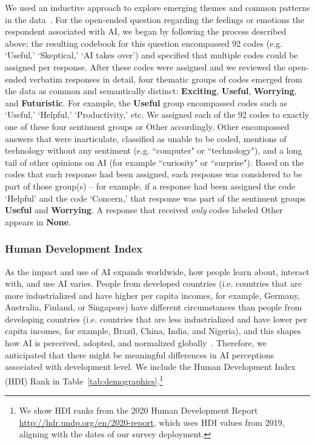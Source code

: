 \documentclass[11pt]{article} %
\def\Exciting/{{\fontfamily{lmss}\selectfont\textbf{Exciting}}}  \def\Useful/{{\fontfamily{lmss}\selectfont\textbf{Useful}}}
\def\Worrying/{{\fontfamily{lmss}\selectfont\textbf{Worrying}}}
\def\Futuristic/{{\fontfamily{lmss}\selectfont\textbf{Futuristic}}}
\def\None/{{\fontfamily{lmss}\selectfont\textbf{None}}}
\begin{document}
We used an inductive approach to explore emerging themes and common patterns in the data~\cite{hinkin1998brief}. For the open-ended question regarding the feelings or emotions the respondent associated with AI, we began by following the process described above; the resulting codebook for this question encompassed 92 codes (e.g. `Useful,' `Skeptical,' `AI takes over') and specified that multiple codes could be assigned per response. After these codes were assigned and we reviewed the open-ended verbatim responses in detail, four thematic groups of codes emerged from the data as common and semantically distinct: \Exciting/, \Useful/, \Worrying/, and \Futuristic/. For example, the \Useful/ group encompassed codes such as `Useful,' `Helpful,' `Productivity,' etc. We assigned each of the 92 codes to exactly one of these four sentiment groups or Other accordingly. Other encompassed answers that were inarticulate, classified as unable to be coded, mentions of technology without any sentiment (e.g. ``computer" or ``technology"), and a long tail of other opinions on AI (for example ``curiosity" or ``surprise"). Based on the codes that each response had been assigned, each response was considered to be part of those group(s) -- for example, if a response had been assigned the code `Helpful' and the code `Concern,' that response was part of the sentiment groups \Useful/ and \Worrying/. A response that received \textit{only} codes labeled Other appears in \None/.

\subsubsection{Human Development Index}\label{HDI_Section}
As the impact and use of AI expands worldwide, how people learn about, interact with, and use AI varies. People from developed countries (i.e. countries that are more industrialized and have higher per capita incomes, for example, Germany, Australia, Finland, or Singapore) have different circumstances than people from developing countries (i.e. countries that are less industrialized and have lower per capita incomes, for example, Brazil, China, India, and Nigeria), and this shapes how AI is perceived, adopted, and normalized globally~\cite{un2014, sambasivan2019toward}. Therefore, we anticipated that there might be meaningful differences in AI perceptions associated with development level. We include the Human Development Index (HDI) Rank in Table~\ref{tab:demographics}.\footnote{We show HDI ranks from the 2020 Human Development Report \url{http://hdr.undp.org/en/2020-report}, which uses HDI values from 2019, aligning with the dates of our survey deployment.}
\end{document}
